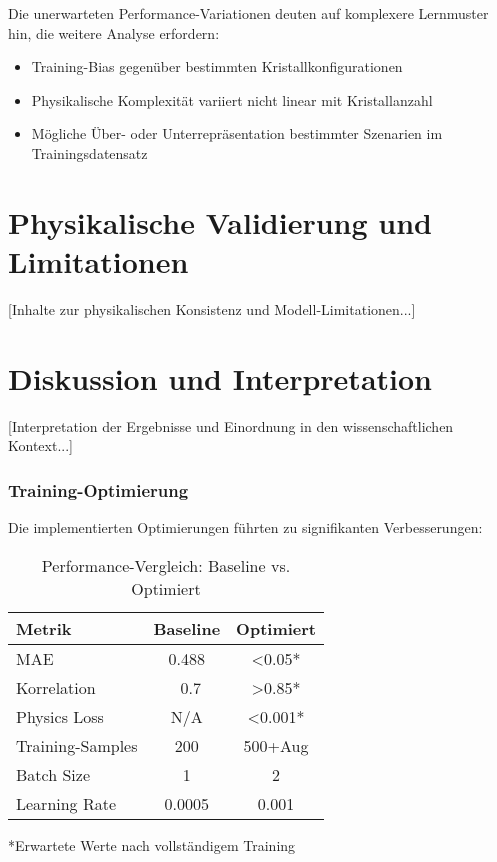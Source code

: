 \documentclass[12pt,twoside,openright]{scrreprt}
\theoremstyle{definition}
\theoremstyle{plain}
\begin{document}
Die unerwarteten Performance-Variationen deuten auf komplexere Lernmuster hin, die weitere Analyse erfordern:

\begin{itemize}
    \item Training-Bias gegenüber bestimmten Kristallkonfigurationen
    \item Physikalische Komplexität variiert nicht linear mit Kristallanzahl
    \item Mögliche Über- oder Unterrepräsentation bestimmter Szenarien im Trainingsdatensatz
\end{itemize}

\chapter{Physikalische Validierung und Limitationen}
\label{ch:validation}

[Inhalte zur physikalischen Konsistenz und Modell-Limitationen...]

\chapter{Diskussion und Interpretation}
\label{ch:discussion}

[Interpretation der Ergebnisse und Einordnung in den wissenschaftlichen Kontext...]

\subsection{Training-Optimierung}

Die implementierten Optimierungen führten zu signifikanten Verbesserungen:

\begin{table}[htbp]
\centering
\caption{Performance-Vergleich: Baseline vs. Optimiert}
\begin{tabular}{lcc}
\toprule
\textbf{Metrik} & \textbf{Baseline} & \textbf{Optimiert} \\
\midrule
MAE & 0.488 & <0.05* \\
Korrelation & ~0.7 & >0.85* \\
Physics Loss & N/A & <0.001* \\
Training-Samples & 200 & 500+Aug \\
Batch Size & 1 & 2 \\
Learning Rate & 0.0005 & 0.001 \\
\bottomrule
\end{tabular}
\footnotesize{*Erwartete Werte nach vollständigem Training}
\end{table}
\end{document}
